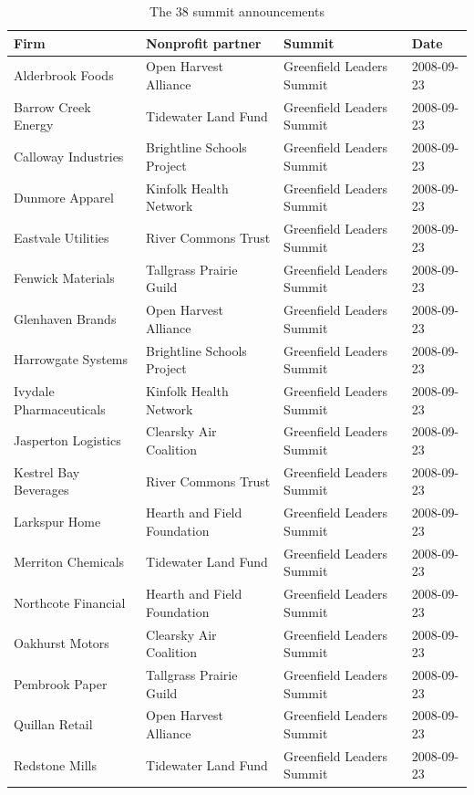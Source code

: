 \documentclass[11pt]{article}
\begin{document}
\begin{table}[h!]
\centering
\begin{threeparttable}
\renewcommand{\thetable}{B1}
\caption{The 38 summit announcements}
\footnotesize
\begin{tabular}{llll}
\toprule
Firm & Nonprofit partner & Summit & Date \\
\midrule
Alderbrook Foods & Open Harvest Alliance & Greenfield Leaders Summit & 2008-09-23 \\
Barrow Creek Energy & Tidewater Land Fund & Greenfield Leaders Summit & 2008-09-23 \\
Calloway Industries & Brightline Schools Project & Greenfield Leaders Summit & 2008-09-23 \\
Dunmore Apparel & Kinfolk Health Network & Greenfield Leaders Summit & 2008-09-23 \\
Eastvale Utilities & River Commons Trust & Greenfield Leaders Summit & 2008-09-23 \\
Fenwick Materials & Tallgrass Prairie Guild & Greenfield Leaders Summit & 2008-09-23 \\
Glenhaven Brands & Open Harvest Alliance & Greenfield Leaders Summit & 2008-09-23 \\
Harrowgate Systems & Brightline Schools Project & Greenfield Leaders Summit & 2008-09-23 \\
Ivydale Pharmaceuticals & Kinfolk Health Network & Greenfield Leaders Summit & 2008-09-23 \\
Jasperton Logistics & Clearsky Air Coalition & Greenfield Leaders Summit & 2008-09-23 \\
Kestrel Bay Beverages & River Commons Trust & Greenfield Leaders Summit & 2008-09-23 \\
Larkspur Home & Hearth and Field Foundation & Greenfield Leaders Summit & 2008-09-23 \\
Merriton Chemicals & Tidewater Land Fund & Greenfield Leaders Summit & 2008-09-23 \\
Northcote Financial & Hearth and Field Foundation & Greenfield Leaders Summit & 2008-09-23 \\
Oakhurst Motors & Clearsky Air Coalition & Greenfield Leaders Summit & 2008-09-23 \\
Pembrook Paper & Tallgrass Prairie Guild & Greenfield Leaders Summit & 2008-09-23 \\
Quillan Retail & Open Harvest Alliance & Greenfield Leaders Summit & 2008-09-23 \\
Redstone Mills & Tidewater Land Fund & Greenfield Leaders Summit & 2008-09-23 \\

\end{tabular}
\end{threeparttable}
\end{table}
\end{document}
